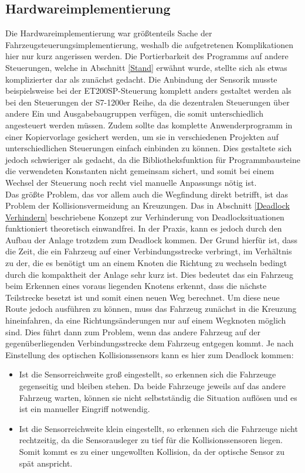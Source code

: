 	\subsection{Hardwareimplementierung}
		\label{Probleme_Hardware}
		Die Hardwareimplementierung war größtenteils Sache der Fahrzeugsteuerungsimplementierung, weshalb die aufgetretenen Komplikationen hier nur kurz angerissen werden. Die Portierbarkeit des Programms auf andere Steuerungen, welche in Abschnitt \ref{Stand} erwähnt wurde, stellte sich als etwas komplizierter dar als zunächst gedacht. Die Anbindung der Sensorik musste beispielsweise bei der ET200SP-Steuerung komplett anders gestaltet werden als bei den Steuerungen der S7-1200er Reihe, da die dezentralen Steuerungen über andere Ein und Ausgabebaugruppen verfügen, die somit unterschiedlich angesteuert werden müssen. Zudem sollte das komplette Anwenderprogramm in einer Kopiervorlage gesichert werden, um sie in verschiedenen Projekten auf unterschiedlichen Steuerungen einfach einbinden zu können. Dies gestaltete sich jedoch schwieriger als gedacht, da die Bibliotheksfunktion für Programmbausteine die verwendeten Konstanten nicht gemeinsam sichert, und somit bei einem Wechsel der Steuerung noch recht viel manuelle Anpassungs nötig ist.
		\\[4pt]
		Das größte Problem, das vor allem auch die Wegfindung direkt betrifft, ist das Problem der Kollisionsvermeidung an Kreuzungen. Das in Abschnitt \ref{Deadlock Verhindern} beschriebene Konzept zur Verhinderung von Deadlocksituationen funktioniert theoretisch einwandfrei. In der Praxis, kann es jedoch durch den Aufbau der Anlage trotzdem zum Deadlock kommen. Der Grund hierfür ist, dass die Zeit, die ein Fahrzeug auf einer Verbindungsstrecke verbringt, im Verhältnis zu der, die es benötigt um an einem Knoten die Richtung zu wechseln bedingt durch die kompaktheit der Anlage sehr kurz ist. Dies bedeutet das ein Fahrzeug beim Erkennen eines voraus liegenden Knotens erkennt, dass die nächste Teilstrecke besetzt ist und somit einen neuen Weg berechnet. Um diese neue Route jedoch ausführen zu können, muss das Fahrzeug zunächst in die Kreuzung hineinfahren, da eine Richtungsänderungen nur auf einem Wegknoten möglich sind. Dies führt dann zum Problem, wenn das andere Fahrzeug auf der gegenüberliegenden Verbindungsstrecke dem Fahrzeug entgegen kommt. Je nach Einstellung des optischen Kollisionssensors kann es hier zum Deadlock kommen:
		\begin{itemize}
			\item Ist die Sensorreichweite groß eingestellt, so erkennen sich die Fahrzeuge gegenseitig und bleiben stehen. Da beide Fahrzeuge jeweils auf das andere Fahrzeug warten, können sie nicht selbstständig die Situation auflösen und es ist ein manueller Eingriff notwendig.
			\item Ist die Sensorreichweite klein eingestellt, so erkennen sich die Fahrzeuge nicht rechtzeitig, da die Sensorausleger zu tief für die Kollisionssensoren liegen. Somit kommt es zu einer ungewollten Kollision, da der optische Sensor zu spät anspricht.
		\end{itemize}
